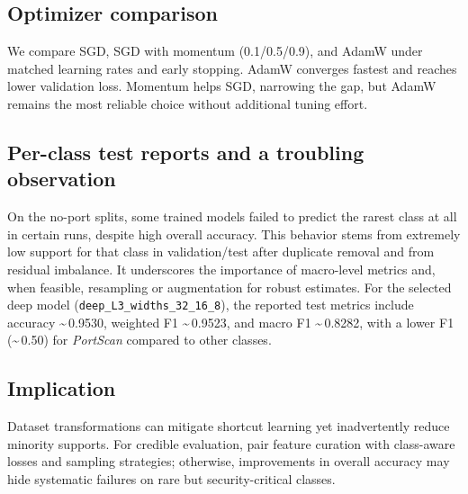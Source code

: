     \subsection{Optimizer comparison}

        We compare SGD, SGD with momentum (0.1/0.5/0.9), and AdamW under matched learning rates and early stopping. 
        AdamW converges fastest and reaches lower validation loss. 
        Momentum helps SGD, narrowing the gap, but AdamW remains the most reliable choice without additional tuning effort.

    \subsection{Per-class test reports and a troubling observation}
    
        On the no-port splits, some trained models failed to predict the rarest class at all in certain runs, despite high overall accuracy. 
        This behavior stems from extremely low support for that class in validation/test after duplicate removal and from residual imbalance. 
        It underscores the importance of macro-level metrics and, when feasible, resampling or augmentation for robust estimates. 
        For the selected deep model (\texttt{deep\_L3\_widths\_32\_16\_8}), the reported test metrics include accuracy \textasciitilde\,0.9530, weighted F1 \textasciitilde\,0.9523, and macro F1 \textasciitilde\,0.8282, with a lower F1 (\textasciitilde\,0.50) for \emph{PortScan} compared to other classes.

    \subsection{Implication}
    Dataset transformations can mitigate shortcut learning yet inadvertently reduce minority supports. 
    For credible evaluation, pair feature curation with class-aware losses and sampling strategies; otherwise, improvements in overall accuracy may hide systematic failures on rare but security-critical classes.
